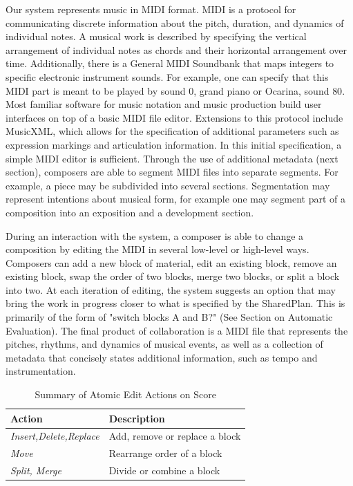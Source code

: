 \documentclass[final,authoryear,5p,times,twocolumn]{elsarticle}
\begin{document}
Our system represents music in MIDI format. MIDI is a protocol for communicating discrete information about the pitch, duration, and dynamics of individual notes. A musical work is described by specifying the vertical arrangement of individual notes as chords and their horizontal arrangement over time. Additionally, there is a General MIDI Soundbank that maps integers to specific electronic instrument sounds. For example, one can specify that this MIDI part is meant to be played by sound $0$, grand piano or Ocarina, sound $80$. Most familiar software for music notation and music production build user interfaces on top of a basic MIDI file editor. Extensions to this protocol include MusicXML, which allows for the specification of additional parameters such as expression markings and articulation information. In this initial specification, a simple MIDI editor is sufficient. Through the use of additional metadata (next section), composers are able to segment MIDI files into separate segments. For example, a piece may be subdivided into several sections. Segmentation may represent intentions about musical form, for example one may segment part of a composition into an exposition and a development section. 

During an interaction with the system, a composer is able to change a composition by editing the MIDI in several low-level or high-level ways. Composers can add a new block of material, edit an existing block, remove an existing block, swap the order of two blocks, merge two blocks, or split a block into two. At each iteration of editing, the system suggests an option that may bring the work in progress closer to what is specified by the SharedPlan. This is primarily of the form of "switch blocks A and B?" (See Section on Automatic Evaluation). The final product of collaboration is a MIDI file that represents the pitches, rhythms, and dynamics of musical events, as well as a collection of metadata that concisely states additional information, such as tempo and instrumentation. 

\begin{table}
    \begin{tabular}{|l|l|}
    	\hline
    	\textbf{Action} & \textbf{Description} \\
    	\hline
    	\textit{Insert,Delete,Replace} & Add, remove or replace a block \\
    	\textit{Move} & Rearrange order of a block \\
    	\textit{Split, Merge} & Divide or combine a block \\
    	\hline
    \end{tabular}
	\caption{Summary of Atomic Edit Actions on Score}
\end{table}
\end{document}
